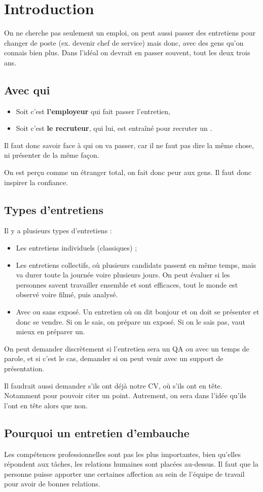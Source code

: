 \section{Introduction}
On ne cherche pas seulement un emploi, on peut aussi passer des entretiens pour changer de poste (ex. devenir chef de service) mais donc, avec des gens qu'on connais bien plus. Dans l'idéal on devrait en passer souvent, tout les deux trois ans.

\subsection{Avec qui}
\begin{itemize}
    \item Soit c'est \textbf{l'employeur} qui fait passer l'entretien,
    \item Soit c'est \textbf{le recruteur}, qui lui, est entraîné pour recruter un .
\end{itemize}

Il faut donc savoir face à qui on va passer, car il ne faut pas dire la même chose, ni présenter de la même façon.

On est perçu comme un étranger total, on fait donc peur aux gens. Il faut donc inspirer la confiance.

\subsection{Types d'entretiens}
Il y a plusieurs types d'entretiens :
\begin{itemize}
    \item Les entretiens individuels (classiques) ;
    \item Les entretiens collectifs, où plusieurs candidats passent en même temps, mais va durer toute la journée voire plusieurs jours. On peut évaluer si les personnes savent travailler ensemble et sont efficaces, tout le monde est observé voire filmé, puis analysé.
    \item Avec ou sans exposé. Un entretien où on dit bonjour et on doit se présenter et donc se vendre. Si on le sais, on prépare un exposé. Si on le sais pas, vaut mieux en préparer un.
\end{itemize}

On peut demander discrètement si l'entretien sera un QA ou avec un temps de parole, et si c'est le cas, demander si on peut venir avec un support de présentation.

Il faudrait aussi demander s'ils ont déjà notre CV, où s'ils ont en tête. Notamment pour pouvoir citer un point. Autrement, on sera dans l'idée qu'ils l'ont en tête alors que non.

\subsection{Pourquoi un entretien d'embauche}
Les compétences professionnelles sont pas les plus importantes, bien qu'elles répondent aux tâches, les relations humaines sont placées au-dessus. Il faut que la personne puisse apporter une certaines affection au sein de l'équipe de travail pour avoir de bonnes relations.
